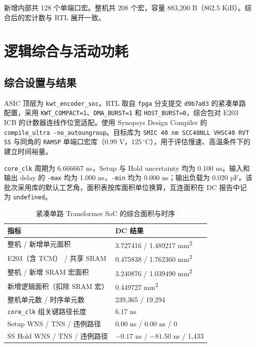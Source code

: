 \documentclass[UTF8,a4paper,zihao=-4,fontset=none,openany,oneside]{ctexrep}
\begin{document}
新增内部共 128 个单端口宏。整机共 208 个宏，容量 883,200 B（862.5 KiB）。综合后的宏计数与 RTL 展开一致。

\section{逻辑综合与活动功耗}\label{sec:extension-synthesis}

\subsection{综合设置与结果}

ASIC 顶层为 \texttt{kwt\_encoder\_soc}。RTL 取自 \texttt{fpga} 分支提交 \texttt{d9b7a03} 的紧凑单路配置，采用 \texttt{KWT\_COMPACT=1}、\texttt{DMA\_BURST=1} 和 \texttt{HOST\_BURST=0}，综合包对 E203 ICB 的计数器连线作位宽适配。使用 Synopsys Design Compiler 的 \texttt{compile\_ultra -no\_autoungroup}。目标库为 \texttt{SMIC 40 nm SCC40NLL VHSC40 RVT SS} 与同角的 \texttt{RAMSP} 单端口宏库（0.99 V，125\,\ensuremath{^\circ}C），用于评估慢速、高温条件下的建立时间裕量。

\texttt{core\_clk} 周期为 6.666667 ns，Setup 与 Hold uncertainty 均为 0.100 ns。输入和输出 delay 的 \texttt{-max} 均为 1.000 ns，\texttt{-min} 均为 0.000 ns；输出负载为 0.020 pF。该批次采用库的默认工艺角，面积表按库面积单位换算，互连面积在 DC 报告中记为 \texttt{undefined}。

\begin{table}[!htp]\centering\fontsize{10}{13}\selectfont
\caption{紧凑单路 Transformer SoC 的综合面积与时序}\label{tab:extension-dc}
\begin{tabularx}{\textwidth}{@{}L{1.11}L{0.89}@{}}
\toprule
{}
指标 & DC 结果 \\
\midrule
整机 / 新增单元面积 & 3.727416 / 1.489217 mm\textsuperscript{2} \\
E203（含 TCM） / 共享 SRAM & 0.475838 / 1.762360 mm\textsuperscript{2} \\
整机 / 新增 SRAM 宏面积 & 3.240876 / 1.039490 mm\textsuperscript{2} \\
新增逻辑面积（扣除 SRAM 宏） & 0.449727 mm\textsuperscript{2} \\
整机单元数 / 时序单元数 & 239,365 / 19,294 \\
\texttt{core\_clk} 组关键路径长度 & 6.17 ns \\
Setup WNS / TNS / 违例路径 & 0.00 ns / 0.00 ns / 0 \\
SS Hold WNS / TNS / 违例路径 & $-0.17$ ns / $-81.50$ ns / 1,433 \\
\bottomrule
\end{tabularx}
\end{table}
\end{document}
